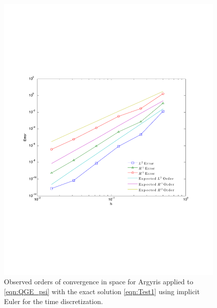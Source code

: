 \begin{figure}
  \begin{center}
    \includegraphics[scale=0.6]{Figures/sin2sin2sinSpaceConvergence.pdf}
    \caption{Observed orders of convergence in space for Argyris applied to
      \eqref{eqn:QGE_psi} with the exact solution \eqref{eqn:Test1} using
      implicit Euler for the time discretization.}
  \label{fig:Test1Space}
  \end{center}
\end{figure}

